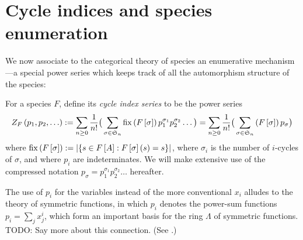\documentclass[sectionflow,singlespace,twoside,boldmathhdr]{brandiss} %
\numberwithin{section}{chapter}
\numberwithin{figure}{chapter}
\begin{document}
\section{Cycle indices and species enumeration}\label{s:cycind}
We now associate to the categorical theory of species an enumerative mechanism---a special power series which keeps track of all the automorphism structure of the species:
\begin{definition}
  \label{def:cycind}
  For a species $F$, define its \emph{cycle index series} to be the power series
  \begin{equation}
    \label{eq:cycinddef}
    Z_{F} \left( {p_{1}, p_{2}, \dots} \right) := \sum_{n \geq 0} \frac{1}{n!} \big( \sum_{\sigma \in \mathfrak{S}_{n}} \operatorname{fix} \left( {F \left[ {\sigma} \right]} \right) p_{1}^{\sigma_{1}} p_{2}^{\sigma_{2}} \dots \big) = \sum_{n \geq 0} \frac{1}{n!} \big( \sum_{\sigma \in \mathfrak{S}_{n}} \left( {F \left[ {\sigma} \right]} \right) p_{\sigma} \big)
  \end{equation}
  where $\operatorname{fix} \left( {F \left[ {\sigma} \right]} \right) := \left\vert {\ensuremath{\left\{ {s \in F \left[ {A} \right] : F \left[ {\sigma} \right] \left( {s} \right) = s} \right\}}} \right\vert$, where $\sigma_{i}$ is the number of $i$-cycles of $\sigma$, and where $p_{i}$ are indeterminates.
  We will make extensive use of the compressed notation $p_{\sigma} = p_{1}^{\sigma_{1}} p_{2}^{\sigma_{2}} \dots$ hereafter.
\end{definition}

The use of $p_{i}$ for the variables instead of the more conventional $x_{i}$ alludes to the theory of symmetric functions, in which $p_{i}$ denotes the power-sum functions $p_{i} = \sum_{j} x_{j}^{i}$, which form an important basis for the ring $\Lambda$ of symmetric functions.
TODO: Say more about this connection. (See \cite{gessel:laginvspec}.)
\end{document}
